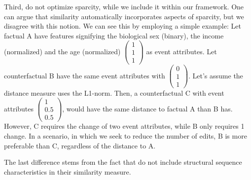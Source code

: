 \documentclass[./../../paper.tex]{subfiles}
\begin{document}
Third, \autocite{hsieh_DiCE4ELInterpretingProcess_2021} do not optimize sparcity, while we include it within our framework. One can argue that similarity automatically incorporates aspects of sparcity, but we disagree with this notion. We can see this by employing a simple example: Let factual A have features signifying the biological sex (binary), the income (normalized) and the age (normalized) $\begin{pmatrix}1\\1\\1\end{pmatrix}$ as event attributes. Let counterfactual B have the same event attributes with $\begin{pmatrix}0\\1\\1\end{pmatrix}$. Let's assume the distance measure uses the L1-norm. Then, a counterfactual C with event attributes $\begin{pmatrix}1\\0.5\\0.5\end{pmatrix}$, would have the same distance to factual A than B has. However, C requires the change of two event attributes, while B only requires 1 change. In a scenario, in which we seek to reduce the number of edits, B is more preferable than C, regardless of the distance to A.

The last difference stems from the fact that \citeauthor{hsieh_DiCE4ELInterpretingProcess_2021} do not include structural sequence characteristics in their similarity measure. 
\end{document}
